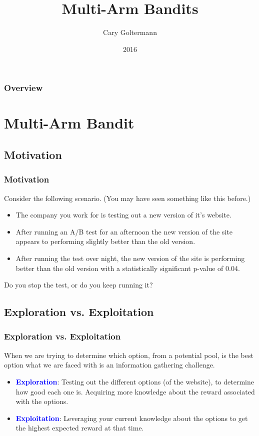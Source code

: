 \documentclass{beamer}
\title{Multi-Arm Bandits}
\author{Cary Goltermann}
\institute{Galvanize}
\date{2016}
\begin{document}
\frame{\titlepage}

\begin{frame}
  \frametitle{Overview}
  \tableofcontents[]
\end{frame}

\section{Multi-Arm Bandit}
\subsection{Motivation}
\begin{frame}
  \frametitle{Motivation}
  Consider the following scenario. (You may have seen something like this before.) \vspace{2mm}
  \begin{itemize}
    \item The company you work for is testing out a new version of it's website. \pause
    \item After running an A/B test for an afternoon the new version of the site appears to performing slightly better than the old version. \pause
    \item After running the test over night, the new version of the site is performing better than the old version with a statistically significant p-value of 0.04. \pause
  \end{itemize} \vspace{3mm}

  Do you stop the test, or do you keep running it?
\end{frame}

\subsection{Exploration vs. Exploitation}
\begin{frame}
  \frametitle{Exploration vs. Exploitation}
  When we are trying to determine which option, from a potential pool, is the best option what we are faced with is an information gathering challenge. \vspace{2mm} \pause
  \begin{itemize}
    \item \textbf{\textcolor{blue}{Exploration}}: Testing out the different options (of the website), to determine how good each one is. Acquiring more knowledge about the reward associated with the options. \pause
    \item \textbf{\textcolor{blue}{Exploitation}}: Leveraging your current knowledge about the options to get the highest expected reward at that time.
  \end{itemize}
\end{frame}
\end{document}
